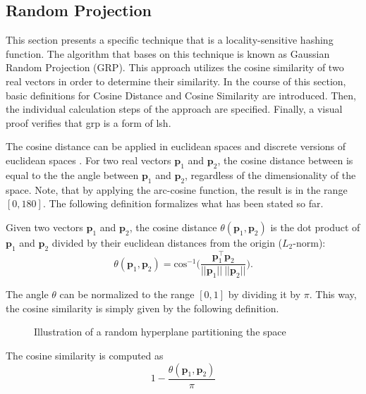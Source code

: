 \documentclass[../../../main.tex]{subfiles}
\begin{document}
\subsection{Random Projection}\label{subsec:random_projection}

This section presents a specific technique that is a locality-sensitive hashing function. The algorithm that bases on this technique is known as Gaussian Random Projection (GRP). This approach utilizes the cosine similarity of two real vectors in order to determine their similarity. In the course of this section, basic definitions for Cosine Distance and Cosine Similarity are introduced. Then, the individual calculation steps of the approach are specified. Finally, a visual proof verifies that \gls{grp} is a form of \gls{lsh}.

The cosine distance can be applied in euclidean spaces and discrete versions of euclidean spaces \cite[95]{leskovec_rajaraman_ullman_2014}. For two real vectors $\bm{p}_1$ and $\bm{p}_2$, the cosine distance between is equal to the the angle between $\bm{p}_1$ and $\bm{p}_2$, regardless of the dimensionality of the space. Note, that by applying the arc-cosine function, the result is in the range $[0, 180]$. The following definition formalizes what has been stated so far.

\begin{definition}
    Given two vectors $\bm{p}_1$ and $\bm{p}_2$, the cosine distance $\theta(\bm{p}_1, \bm{p}_2)$ is the dot product of $\bm{p}_1$ and $\bm{p}_2$ divided by their euclidean distances from the origin ($L_2$-norm):
    \begin{equation}
        \theta(\bm{p}_1, \bm{p}_2) = \text{cos}^{-1} \bigg( \frac{\bm{p}_1^\top \bm{p}_2}{||\bm{p}_1|| \: ||\bm{p}_2||} \Bigg).
    \end{equation}
\end{definition}

The angle $\theta$ can be normalized to the range $[0, 1]$ by dividing it by $\pi$. This way, the cosine similarity is simply given by the following definition.

\begin{figure}[t!]
    \centering
    
    \caption{Illustration of a random hyperplane partitioning the space}
    \label{fig:rp_3d}
\end{figure}

\begin{definition}
    The cosine similarity is computed as
    \begin{equation}
        1- \frac{\theta(\bm{p}_1, \bm{p}_2)}{\pi}
    \end{equation}
\end{definition}
\end{document}
